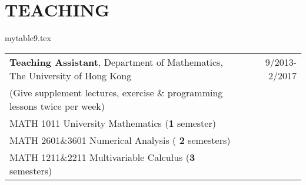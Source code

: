 \documentclass[10pt,letterpaper]{article}
\begin{document}
\section*{TEACHING}
\begin{filecontents}{mytable9.tex}
\begin{longtable}{Xr}

 {\bf Teaching Assistant},  Department of Mathematics, The University of Hong Kong & 9/2013-2/2017\\
  (Give supplement lectures, exercise \& programming lessons twice per week) & \\
MATH 1011 University Mathematics ({\bf 1} semester) & \\
MATH 2601\&3601 Numerical Analysis ( {\bf 2} semesters) & \\
MATH 1211\&2211 Multivariable Calculus ({\bf 3} semesters) & \\
\end{longtable}
\end{filecontents}


\end{document}
